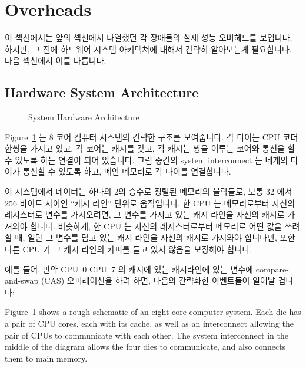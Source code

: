 
\section{Overheads}
\label{sec:cpu:Overheads}

이 섹션에서는 앞의 섹션에서 나열했던 각 장애들의 실제 성능 오버헤드를 보입니다.
하지만, 그 전에 하드웨어 시스템 아키텍쳐에 대해서 간략히 알아보는게 필요합니다.
다음 섹션에서 이를 다룹니다.

\subsection{Hardware System Architecture}
\label{sec:cpu:Hardware System Architecture}

\begin{figure}[tb]
\centering
{}
\caption{System Hardware Architecture}
\label{fig:cpu:System Hardware Architecture}
\end{figure}

Figure~\ref{fig:cpu:System Hardware Architecture} 는 8 코어 컴퓨터 시스템의
간략한 구조를 보여줍니다.
각 다이는 CPU 코더 한쌍을 가지고 있고, 각 코어는 캐시를 갖고, 각 캐시는 쌍을
이루는 코어와 통신을 할 수 있도록 하는 연결이 되어 있습니다.
그림 중간의 system interconnect 는 네개의 다이가 통신할 수 있도록 하고, 메인
메모리로 각 다이를 연결합니다.

이 시스템에서 데이터는 하나의 2의 승수로 정렬된 메모리의 블락들로, 보통 32 에서
256 바이트 사이인 ``캐시 라인'' 단위로 움직입니다.
한 CPU 는 메모리로부터 자신의 레지스터로 변수를 가져오려면, 그 변수를 가지고
있는 캐시 라인을 자신의 캐시로 가져와야 합니다.
비슷하게, 한 CPU 는 자신의 레지스터로부터 메모리로 어떤 값을 쓰려 할 때, 일단
그 변수를 담고 있는 캐시 라인을 자신의 캐시로 가져와야 합니다만, 또한 다른 CPU
가 그 캐시 라인의 카피를 들고 있지 않음을 보장해야 합니다.

예를 들어, 만약 CPU~0 CPU~7 의 캐시에 있는 캐시라인에 있는 변수에
compare-and-swap (CAS) 오퍼레이션을 하려 하면, 다음의 간략화한 이벤트들이
일어날 겁니다:

\iffalse
Figure~\ref{fig:cpu:System Hardware Architecture}
shows a rough schematic of an eight-core computer system.
Each die has a pair of CPU cores, each with its cache, as well as an
interconnect allowing the pair of CPUs to communicate with each other.
The system interconnect in the middle of the diagram allows the
four dies to communicate, and also connects them to main memory.

